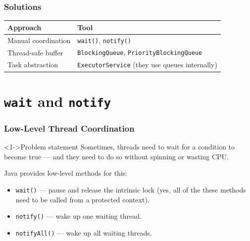 \documentclass[xcolor={dvipsnames,svgnames},aspectratio=169]{beamer}
\begin{document}
\begin{frame}[fragile]
  \frametitle{\faBriefcaseMedical \quad Solutions}

    \begin{table}[h]
    \centering
    \begin{tabularx}{\textwidth}{|l|X|}
      \hline
      \textbf{Approach} & \textbf{Tool} \\
      \hline
      Manual coordination	& \texttt{wait()}, \texttt{notify()} \\
      \hline
      Thread-safe buffer & \texttt{BlockingQueue}, \texttt{PriorityBlockingQueue} \\
      \hline
      Task abstraction & \texttt{ExecutorService} (they use queues internally) \\
      \hline
    \end{tabularx}
  \end{table}
\end{frame}

\section{\texttt{wait} and \texttt{notify}}

\begin{frame}[fragile]
  \frametitle{Low-Level Thread Coordination}

  \begin{block}<1->{\faPuzzlePiece \quad Problem statement}
    Sometimes, threads need to wait for a condition to become true --- and they
    need to do so without spinning or wasting CPU.
  \end{block}
  \vspace{0.4cm}
  \faBook\quad Java provides low-level methods for this:
  \begin{itemize}
  \item[\faBook] \texttt{wait()} --- pause and release the intrinsic lock (yes,
    all of the these methods need to be called from a protected context).
  \item[\faBook] \texttt{notify()} --- wake up one waiting thread.
  \item[\faBook] \texttt{notifyAll()} --- wake up all waiting threads.
  \end{itemize}
\end{frame}
\end{document}

